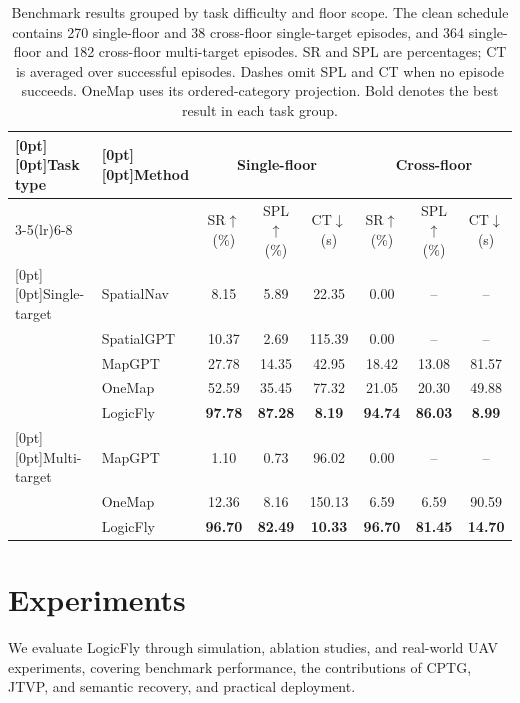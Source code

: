 \documentclass[letterpaper,10pt,journal]{IEEEtran}
\begin{document}
\begin{table}[t]
\caption{Benchmark results grouped by task difficulty and floor scope. The clean schedule contains 270 single-floor and 38 cross-floor single-target episodes, and 364 single-floor and 182 cross-floor multi-target episodes. SR and SPL are percentages; CT is averaged over successful episodes. Dashes omit SPL and CT when no episode succeeds. OneMap uses its ordered-category projection. Bold denotes the best result in each task group.}
\label{tab:main}\centering\small\renewcommand{\arraystretch}{1.15}
\begin{tabular*}{0.94\textwidth}{@{\extracolsep{\fill}}llcccccc@{}}\toprule
\raisebox{-8pt}[0pt][0pt]{Task type}&\raisebox{-8pt}[0pt][0pt]{Method}&\multicolumn{3}{c}{Single-floor}&\multicolumn{3}{c}{Cross-floor}\\
\cmidrule(lr){3-5}\cmidrule(lr){6-8}
&&SR$\uparrow$ (\%)&SPL$\uparrow$ (\%)&CT$\downarrow$ (s)&SR$\uparrow$ (\%)&SPL$\uparrow$ (\%)&CT$\downarrow$ (s)\\\midrule
\raisebox{-22.9pt}[0pt][0pt]{Single-target}&SpatialNav&8.15&5.89&22.35&0.00&\multicolumn{1}{c}{--}&\multicolumn{1}{c}{--}\\
&SpatialGPT&10.37&2.69&115.39&0.00&\multicolumn{1}{c}{--}&\multicolumn{1}{c}{--}\\
&MapGPT&27.78&14.35&42.95&18.42&13.08&81.57\\
&OneMap&52.59&35.45&77.32&21.05&20.30&49.88\\
&LogicFly&\textbf{97.78}&\textbf{87.28}&\textbf{8.19}&\textbf{94.74}&\textbf{86.03}&\textbf{8.99}\\\midrule
\raisebox{-11.45pt}[0pt][0pt]{Multi-target}&MapGPT&1.10&0.73&96.02&0.00&\multicolumn{1}{c}{--}&\multicolumn{1}{c}{--}\\
&OneMap&12.36&8.16&150.13&6.59&6.59&90.59\\
&LogicFly&\textbf{96.70}&\textbf{82.49}&\textbf{10.33}&\textbf{96.70}&\textbf{81.45}&\textbf{14.70}\\\bottomrule
\end{tabular*}
\end{table}

\section{Experiments}
We evaluate LogicFly through simulation, ablation studies, and real-world UAV experiments, covering benchmark performance, the contributions of CPTG, JTVP, and semantic recovery, and practical deployment.
\end{document}
